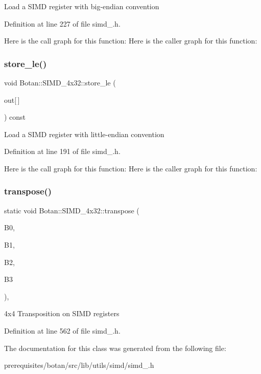 Load a S\+I\+MD register with big-\/endian convention 

Definition at line 227 of file simd\+\_.\+h.

Here is the call graph for this function\+:
Here is the caller graph for this function\+:
\mbox{\label{class_botan_1_1_s_i_m_d__4x32_a3bfb23404c6906d0bdb61f3c462edc2a}} 
\subsubsection{\texorpdfstring{store\+\_\+le()}{store\_le()}}
{\footnotesize\ttfamily void Botan\+::\+S\+I\+M\+D\+\_\+4x32\+::store\+\_\+le (\begin{DoxyParamCaption}\item[{uint8\+\_\+t}]{out\mbox{[}$\,$\mbox{]} }\end{DoxyParamCaption}) const\hspace{0.3cm}{\ttfamily [inline]}}

Load a S\+I\+MD register with little-\/endian convention 

Definition at line 191 of file simd\+\_.\+h.

Here is the call graph for this function\+:
Here is the caller graph for this function\+:
\mbox{\label{class_botan_1_1_s_i_m_d__4x32_a900ee1610d3e60c3bc35c02bbc96b1e5}} 
\subsubsection{\texorpdfstring{transpose()}{transpose()}}
{\footnotesize\ttfamily static void Botan\+::\+S\+I\+M\+D\+\_\+4x32\+::transpose (\begin{DoxyParamCaption}\item[{\mbox{\hyperlink{class_botan_1_1_s_i_m_d__4x32}{S\+I\+M\+D\+\_\+4x32}} \&}]{B0,  }\item[{\mbox{\hyperlink{class_botan_1_1_s_i_m_d__4x32}{S\+I\+M\+D\+\_\+4x32}} \&}]{B1,  }\item[{\mbox{\hyperlink{class_botan_1_1_s_i_m_d__4x32}{S\+I\+M\+D\+\_\+4x32}} \&}]{B2,  }\item[{\mbox{\hyperlink{class_botan_1_1_s_i_m_d__4x32}{S\+I\+M\+D\+\_\+4x32}} \&}]{B3 }\end{DoxyParamCaption})\hspace{0.3cm}{\ttfamily [inline]}, {\ttfamily [static]}}

4x4 Transposition on S\+I\+MD registers 

Definition at line 562 of file simd\+\_.\+h.



The documentation for this class was generated from the following file\+:\begin{DoxyCompactItemize}
\item 
prerequisites/botan/src/lib/utils/simd/simd\+\_.\+h\end{DoxyCompactItemize}
